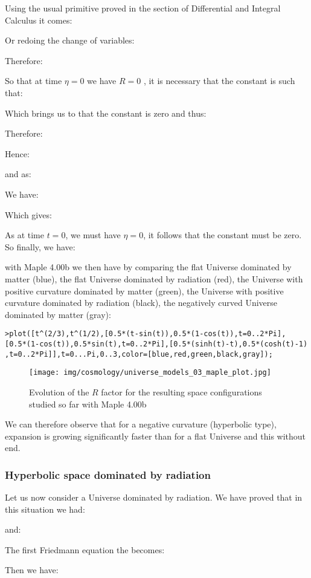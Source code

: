 	Using the usual primitive proved in the section of Differential and Integral Calculus it comes:
	
	Or redoing the change of variables:
	
	Therefore:
	
	So that at time $\eta=0$ we have $R=0$ , it is necessary that the constant is such that:
	
	Which brings us to that the constant is zero and thus:
	
	Therefore:
	
	Hence:
	
	and as:
	
	We have:
	
	Which gives:
	
	As at time $t=0$, we must have $\eta=0$, it follows that the constant must be zero. So finally, we have:
	
	with Maple 4.00b we then have by comparing the flat Universe dominated by matter (blue), the flat Universe dominated by radiation (red), the Universe with positive curvature dominated by matter (green), the Universe with positive curvature dominated by radiation (black), the negatively curved Universe dominated by matter (gray):
	
	\texttt{>plot([t\string^(2/3),t\string^(1/2),[0.5*(t-sin(t)),0.5*(1-cos(t)),t=0..2*Pi],}\\
	\texttt{[0.5*(1-cos(t)),0.5*sin(t),t=0..2*Pi],[0.5*(sinh(t)-t),0.5*(cosh(t)-1)}
	\texttt{,t=0..2*Pi]],t=0...Pi,0..3,color=[blue,red,green,black,gray]);}
	\begin{figure}[H]
		\centering
		\texttt{[image: img/cosmology/universe\_models\_03\_maple\_plot.jpg]}
		\caption[]{Evolution of the $R$ factor for the resulting space configurations studied so far with Maple 4.00b}
	\end{figure}
	We can therefore observe that for a negative curvature (hyperbolic type), expansion is growing significantly faster than for a flat Universe and this without end.
	
	\subsubsection{Hyperbolic space dominated by radiation}
	Let us now consider a Universe dominated by radiation. We have proved that in this situation we had:
	
	and:
	
	The first Friedmann equation the becomes:
	
	Then we have:
	
